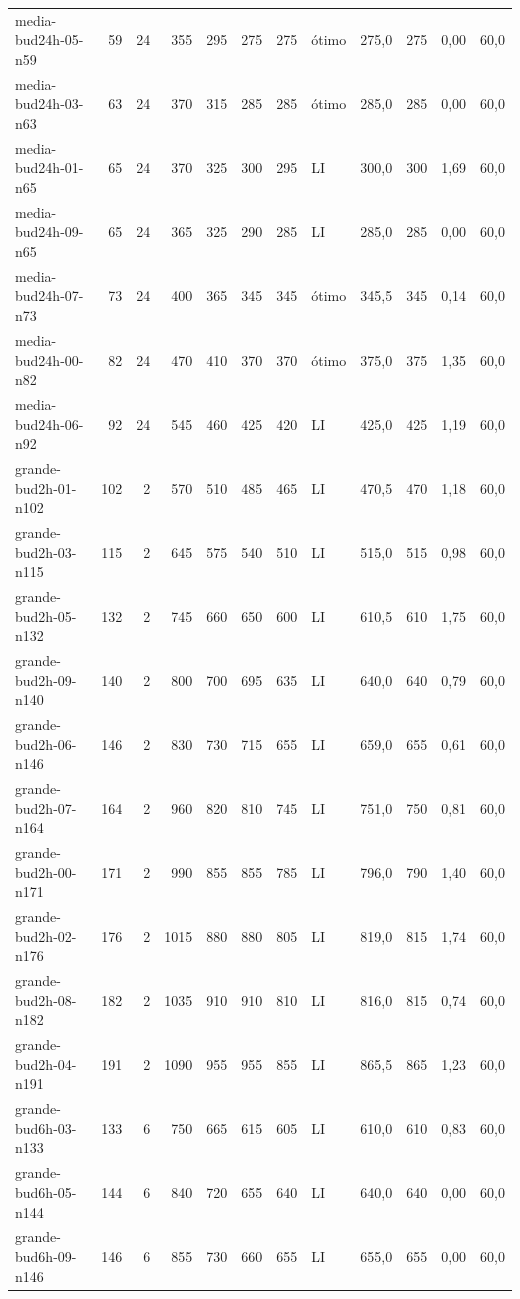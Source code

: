 \begin{longtable}{@{}lrrrrrrlrrrr@{}}
media-bud24h-05-n59 & 59 & 24 & 355 & 295 & 275 & 275 & ótimo & 275,0 & 275 & 0,00 & 60,0 \\
media-bud24h-03-n63 & 63 & 24 & 370 & 315 & 285 & 285 & ótimo & 285,0 & 285 & 0,00 & 60,0 \\
media-bud24h-01-n65 & 65 & 24 & 370 & 325 & 300 & 295 & LI & 300,0 & 300 & 1,69 & 60,0 \\
media-bud24h-09-n65 & 65 & 24 & 365 & 325 & 290 & 285 & LI & 285,0 & 285 & 0,00 & 60,0 \\
media-bud24h-07-n73 & 73 & 24 & 400 & 365 & 345 & 345 & ótimo & 345,5 & 345 & 0,14 & 60,0 \\
media-bud24h-00-n82 & 82 & 24 & 470 & 410 & 370 & 370 & ótimo & 375,0 & 375 & 1,35 & 60,0 \\
media-bud24h-06-n92 & 92 & 24 & 545 & 460 & 425 & 420 & LI & 425,0 & 425 & 1,19 & 60,0 \\
grande-bud2h-01-n102 & 102 & 2 & 570 & 510 & 485 & 465 & LI & 470,5 & 470 & 1,18 & 60,0 \\
grande-bud2h-03-n115 & 115 & 2 & 645 & 575 & 540 & 510 & LI & 515,0 & 515 & 0,98 & 60,0 \\
grande-bud2h-05-n132 & 132 & 2 & 745 & 660 & 650 & 600 & LI & 610,5 & 610 & 1,75 & 60,0 \\
grande-bud2h-09-n140 & 140 & 2 & 800 & 700 & 695 & 635 & LI & 640,0 & 640 & 0,79 & 60,0 \\
grande-bud2h-06-n146 & 146 & 2 & 830 & 730 & 715 & 655 & LI & 659,0 & 655 & 0,61 & 60,0 \\
grande-bud2h-07-n164 & 164 & 2 & 960 & 820 & 810 & 745 & LI & 751,0 & 750 & 0,81 & 60,0 \\
grande-bud2h-00-n171 & 171 & 2 & 990 & 855 & 855 & 785 & LI & 796,0 & 790 & 1,40 & 60,0 \\
grande-bud2h-02-n176 & 176 & 2 & 1015 & 880 & 880 & 805 & LI & 819,0 & 815 & 1,74 & 60,0 \\
grande-bud2h-08-n182 & 182 & 2 & 1035 & 910 & 910 & 810 & LI & 816,0 & 815 & 0,74 & 60,0 \\
grande-bud2h-04-n191 & 191 & 2 & 1090 & 955 & 955 & 855 & LI & 865,5 & 865 & 1,23 & 60,0 \\
grande-bud6h-03-n133 & 133 & 6 & 750 & 665 & 615 & 605 & LI & 610,0 & 610 & 0,83 & 60,0 \\
grande-bud6h-05-n144 & 144 & 6 & 840 & 720 & 655 & 640 & LI & 640,0 & 640 & 0,00 & 60,0 \\
grande-bud6h-09-n146 & 146 & 6 & 855 & 730 & 660 & 655 & LI & 655,0 & 655 & 0,00 & 60,0 \\

\end{longtable}
